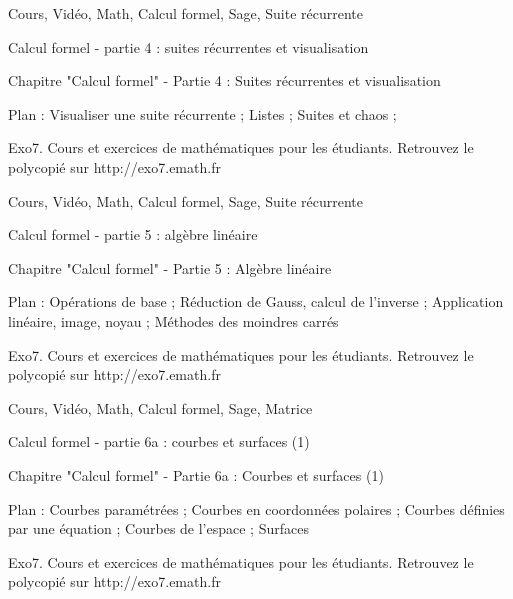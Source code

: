
Cours, Vidéo, Math, Calcul formel, Sage, Suite récurrente





Calcul formel - partie 4 : suites récurrentes et visualisation



Chapitre "Calcul formel" - Partie 4 : Suites récurrentes et visualisation

Plan : Visualiser une suite récurrente ; Listes ; Suites et chaos ; 

Exo7. Cours et exercices de mathématiques pour les étudiants.
Retrouvez le polycopié sur http://exo7.emath.fr


Cours, Vidéo, Math, Calcul formel, Sage, Suite récurrente





Calcul formel - partie 5 : algèbre linéaire



Chapitre "Calcul formel" - Partie 5 : Algèbre linéaire

Plan : Opérations de base ; Réduction de Gauss, calcul de l’inverse ;
Application linéaire, image, noyau ;  Méthodes des moindres carrés

Exo7. Cours et exercices de mathématiques pour les étudiants.
Retrouvez le polycopié sur http://exo7.emath.fr


Cours, Vidéo, Math, Calcul formel, Sage, Matrice





Calcul formel - partie 6a : courbes et surfaces (1)



Chapitre "Calcul formel" - Partie 6a : Courbes et surfaces (1)

Plan : Courbes paramétrées ; Courbes en coordonnées polaires ; 
Courbes définies par une équation ; Courbes de l’espace ; 
Surfaces

Exo7. Cours et exercices de mathématiques pour les étudiants.
Retrouvez le polycopié sur http://exo7.emath.fr


